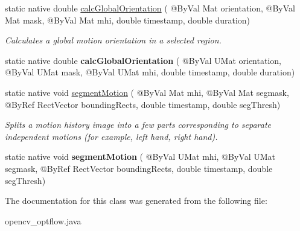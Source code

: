 \begin{DoxyCompactItemize}
static native double \hyperlink{group__optflow_gae09be23e6ebae54e6dad95914a82282d}{calc\+Global\+Orientation} ( @By\+Val Mat orientation, @By\+Val Mat mask, @By\+Val Mat mhi, double timestamp, double duration)
\begin{DoxyCompactList}\small\item\em Calculates a global motion orientation in a selected region. \end{DoxyCompactList}\item 
static native double {\bfseries calc\+Global\+Orientation} ( @By\+Val U\+Mat orientation, @By\+Val U\+Mat mask, @By\+Val U\+Mat mhi, double timestamp, double duration)
\item 
static native void \hyperlink{group__optflow_gad1ff5ca68f3f39b0547c8d249b99185b}{segment\+Motion} ( @By\+Val Mat mhi, @By\+Val Mat segmask, @By\+Ref Rect\+Vector bounding\+Rects, double timestamp, double seg\+Thresh)
\begin{DoxyCompactList}\small\item\em Splits a motion history image into a few parts corresponding to separate independent motions (for example, left hand, right hand). \end{DoxyCompactList}\item 
static native void {\bfseries segment\+Motion} ( @By\+Val U\+Mat mhi, @By\+Val U\+Mat segmask, @By\+Ref Rect\+Vector bounding\+Rects, double timestamp, double seg\+Thresh)
\end{DoxyCompactItemize}


The documentation for this class was generated from the following file\+:\begin{DoxyCompactItemize}
\item 
opencv\+\_\+optflow.\+java\end{DoxyCompactItemize}
